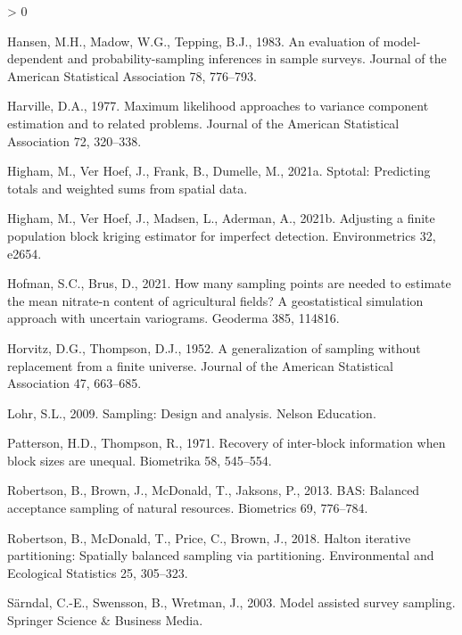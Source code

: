 \documentclass[]{elsarticle} %
\newlength{\cslhangindent}
\newenvironment{CSLReferences}[2] %
 {%
  \setlength{\parindent}{0pt}
  \ifodd #1 \everypar{\setlength{\hangindent}{\cslhangindent}}\ignorespaces\fi
  \ifnum #2 > 0
  \setlength{\parskip}{#2\baselineskip}
  \fi
 }%
 {}
\begin{document}
\begin{CSLReferences}{1}{0}
\leavevmode\hypertarget{ref-hansen1983evaluation}{}%
Hansen, M.H., Madow, W.G., Tepping, B.J., 1983. An evaluation of
model-dependent and probability-sampling inferences in sample surveys.
Journal of the American Statistical Association 78, 776--793.

\leavevmode\hypertarget{ref-harville1977maximum}{}%
Harville, D.A., 1977. Maximum likelihood approaches to variance
component estimation and to related problems. Journal of the American
Statistical Association 72, 320--338.

\leavevmode\hypertarget{ref-higham2021sptotal}{}%
Higham, M., Ver Hoef, J., Frank, B., Dumelle, M., 2021a. Sptotal:
Predicting totals and weighted sums from spatial data.

\leavevmode\hypertarget{ref-higham2021adjusting}{}%
Higham, M., Ver Hoef, J., Madsen, L., Aderman, A., 2021b. Adjusting a
finite population block kriging estimator for imperfect detection.
Environmetrics 32, e2654.

\leavevmode\hypertarget{ref-hofman2021many}{}%
Hofman, S.C., Brus, D., 2021. How many sampling points are needed to
estimate the mean nitrate-n content of agricultural fields? A
geostatistical simulation approach with uncertain variograms. Geoderma
385, 114816.

\leavevmode\hypertarget{ref-horvitz1952generalization}{}%
Horvitz, D.G., Thompson, D.J., 1952. A generalization of sampling
without replacement from a finite universe. Journal of the American
Statistical Association 47, 663--685.

\leavevmode\hypertarget{ref-lohr2009sampling}{}%
Lohr, S.L., 2009. Sampling: Design and analysis. Nelson Education.

\leavevmode\hypertarget{ref-patterson1971recovery}{}%
Patterson, H.D., Thompson, R., 1971. Recovery of inter-block information
when block sizes are unequal. Biometrika 58, 545--554.

\leavevmode\hypertarget{ref-robertson2013bas}{}%
Robertson, B., Brown, J., McDonald, T., Jaksons, P., 2013. BAS: Balanced
acceptance sampling of natural resources. Biometrics 69, 776--784.

\leavevmode\hypertarget{ref-robertson2018halton}{}%
Robertson, B., McDonald, T., Price, C., Brown, J., 2018. Halton
iterative partitioning: Spatially balanced sampling via partitioning.
Environmental and Ecological Statistics 25, 305--323.

\leavevmode\hypertarget{ref-sarndal2003model}{}%
Särndal, C.-E., Swensson, B., Wretman, J., 2003. Model assisted survey
sampling. Springer Science \& Business Media.


\end{CSLReferences}
\end{document}
